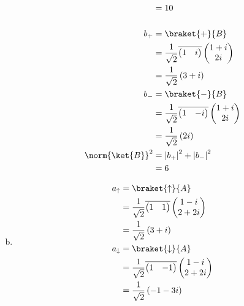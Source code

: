 \documentclass[10pt]{mypackage}
\begin{document}
\begin{enumerate}[(a)]
\begin{align*}
                       &= 10\\
                       \\
      b_{+} &= \braket{+}{B}\\
            &= \frac{1}{\sqrt{2}} \overline{ \begin{pmatrix}1 & i\end{pmatrix} } \begin{pmatrix}1+i\\2i\end{pmatrix}\\
            &= \frac{1}{\sqrt{2}} \left(3+i\right)\\
      b_{-} &= \braket{-}{B}\\
            &= \frac{1}{\sqrt{2}} \overline{ \begin{pmatrix}1 & -i\end{pmatrix} } \begin{pmatrix}1 + i \\ 2i\end{pmatrix}\\
            &= \frac{1}{\sqrt{2}} \left(2i\right)\\
      \norm{\ket{B}}^2 &= \left\vert b_{+} \right\vert^2 + \left\vert b_{-} \right\vert^2\\
                       &= 6
    \end{align*}
  \item 
    \begin{align*}
      a_{\uparrow} &= \braket{\uparrow}{A}\\
                   &= \frac{1}{\sqrt{2}} \overline{ \begin{pmatrix}1 & 1\end{pmatrix} } \begin{pmatrix}1-i\\2+2i\end{pmatrix}\\
                   &= \frac{1}{\sqrt{2}} \left(3 + i\right)\\
      a_{\downarrow} &= \braket{\downarrow}{A}\\
                     &= \frac{1}{\sqrt{2}} \overline{ \begin{pmatrix}1 & -1\end{pmatrix} } \begin{pmatrix}1-i\\2+2i\end{pmatrix}\\
                     &= \frac{1}{\sqrt{2}} \left(-1-3i\right)\\

\end{align*}
\end{enumerate}
\end{document}
